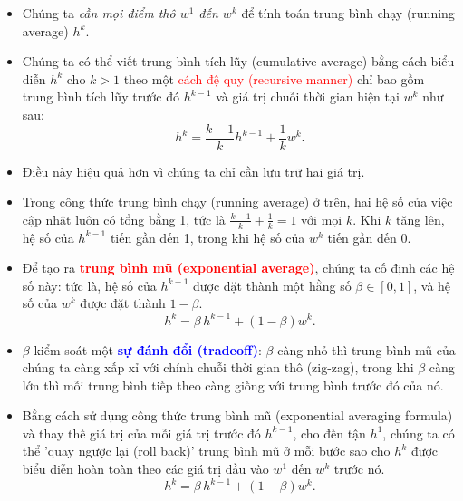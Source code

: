 \documentclass{book}
\begin{document}
\begin{itemize}
    \item Chúng ta \textit{cần mọi điểm thô $w^1$ đến $w^k$} để tính toán trung bình chạy (running average) $h^k$.
    \item Chúng ta có thể viết trung bình tích lũy (cumulative average) bằng cách biểu diễn $h^k$ cho $k>1$ theo một \textcolor{red}{cách đệ quy (recursive manner)} chỉ bao gồm trung bình tích lũy trước đó $h^{k-1}$ và giá trị chuỗi thời gian hiện tại $w^k$ như sau:
    \begin{equation*}
        h^{k} = \frac{k-1}{k}h^{k-1} + \frac{1}{k}w^k.
    \end{equation*}
    \item Điều này hiệu quả hơn vì chúng ta chỉ cần lưu trữ hai giá trị.
    \item Trong công thức trung bình chạy (running average) ở trên, hai hệ số của việc cập nhật luôn có tổng bằng 1, tức là $\frac{k-1}{k} + \frac{1}{k} = 1$ với mọi $k$. Khi $k$ tăng lên, hệ số của $h^{k-1}$ tiến gần đến 1, trong khi hệ số của $w^k$ tiến gần đến 0.
    \item Để tạo ra \textbf{\textcolor{red}{trung bình mũ (exponential average)}}, chúng ta cố định các hệ số này: tức là, hệ số của $h^{k-1}$ được đặt thành một hằng số $\beta\in[0,1]$, và hệ số của $w^k$ được đặt thành $1-\beta$.
    \begin{equation*}
        h^{k} = \beta \, h^{k-1} +  \left(1 - \beta\right)w^k.
    \end{equation*}
    \item $\beta$ kiểm soát một \textbf{\textcolor{blue}{sự đánh đổi (tradeoff)}}: $\beta$ càng nhỏ thì trung bình mũ của chúng ta càng xấp xỉ với chính chuỗi thời gian thô (zig-zag), trong khi $\beta$ càng lớn thì mỗi trung bình tiếp theo càng giống với trung bình trước đó của nó.
    \item Bằng cách sử dụng công thức trung bình mũ (exponential averaging formula) và thay thế giá trị của mỗi giá trị trước đó $h^{k-1}$, cho đến tận $h^1$, chúng ta có thể 'quay ngược lại (roll back)' trung bình mũ ở mỗi bước sao cho $h^k$ được biểu diễn hoàn toàn theo các giá trị đầu vào $w^1$ đến $w^k$ trước nó.
    \begin{equation*}
        h^{k} = \beta \, h^{k-1} +  \left(1 - \beta\right)w^k.
    \end{equation*}


\end{itemize}
\end{document}
